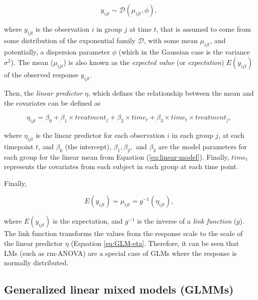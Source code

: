 \documentclass[
]{article}
\begin{document}
\begin{equation}
y_{ijt} \sim \mathcal{D}(\mu_{ijt},\phi),
\label{eq:GLM-y}
\end{equation}

where \(y_{ijt}\) is the observation \(i\) in group \(j\) at time \(t\), that is assumed to come from some distribution of the exponential family \(\mathcal{D}\), with some mean \(\mu_{ijt}\), and potentially, a dispersion parameter \(\phi\) (which in the Gaussian case is the variance \(\sigma^{2}\)). The mean (\(\mu_{ijt}\)) is also known as the \emph{expected value} (or \emph{expectation}) \(E(y_{ijt})\) of the observed response \(y_{ijt}\).

Then, the \emph{linear predictor} \(\eta\), which defines the relationship between the mean and the covariates can be defined as

\begin{equation}
\eta_{ijt}=\beta_0+\beta_1 \times treatment_{j} +\beta_2 \times time_{t} +\beta_3 \times time_{t}\times treatment_{j},
\label{eq:GLM-eta}
\end{equation}

where \(\eta_{ijt}\) is the linear predictor for each observation \(i\) in each group \(j\), at each timepoint \(t\), and \(\beta_0\) (the intercept), \(\beta_{1}, \beta_2,\) and \(\beta_3\) are the model parameters for each group for the linear mean from Equation (\eqref{eq:linear-model}). Finally, \(time_{t}\) represents the covariates from each subject in each group at each time point.

Finally,

\begin{equation}
E(y_{ijt})=\mu_{ijt}=g^{-1}(\eta_{ijt}),
\label{eq:GLM-Expectation}
\end{equation}

where \(E(y_{ijt})\) is the expectation, and \(g^{-1}\) is the inverse of a \emph{link function} (\(g\)). The link function transforms the values from the response scale to the scale of the linear predictor \(\eta\) (Equation \eqref{eq:GLM-eta}. Therefore, it can be seen that LMs (such as rm-ANOVA) are a special case of GLMs where the response is normally distributed.

\hypertarget{generalized-linear-mixed-models-glmms}{%
\subsection{Generalized linear mixed models (GLMMs)}\label{generalized-linear-mixed-models-glmms}}
\end{document}
